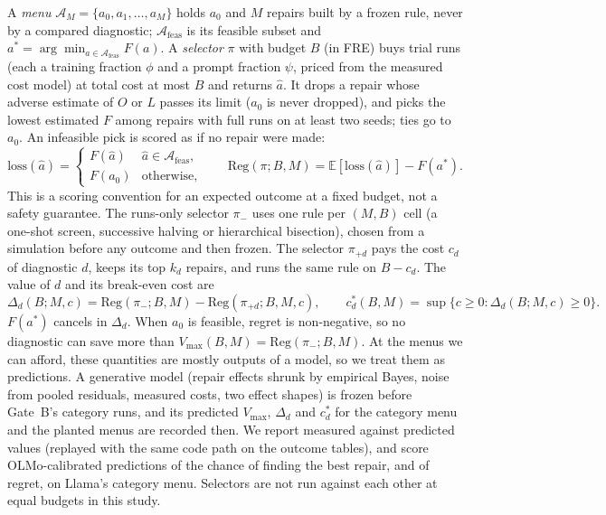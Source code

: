 \documentclass{article}
\theoremstyle{plain}
\theoremstyle{definition}
\theoremstyle{remark}
\begin{document}
A \emph{menu} $\mathcal{A}_M = \{a_0, a_1, \dots, a_M\}$ holds $a_0$ and $M$
repairs built by a frozen rule, never by a compared diagnostic;
$\mathcal{A}_{\mathrm{feas}}$ is its feasible subset and
$a^* = \arg\min_{a \in \mathcal{A}_{\mathrm{feas}}} F(a)$. A \emph{selector}
$\pi$ with budget $B$ (in FRE) buys trial runs (each a training fraction $\phi$
and a prompt fraction $\psi$, priced from the measured cost model) at total
cost at most $B$ and returns $\hat a$. It drops a repair whose adverse estimate
of $O$ or $L$ passes its limit ($a_0$ is never dropped), and picks the lowest
estimated $F$ among repairs with full runs on at least two seeds; ties go to
$a_0$. An infeasible pick is scored as if no repair were made:
\begin{equation*}
  \mathrm{loss}(\hat a) = \begin{cases} F(\hat a) & \hat a \in \mathcal{A}_{\mathrm{feas}},\\ F(a_0) & \text{otherwise,} \end{cases}
  \qquad
  \mathrm{Reg}(\pi; B, M) = \mathbb{E}[\mathrm{loss}(\hat a)] - F(a^*).
\end{equation*}
This is a scoring convention for an expected outcome at a fixed budget, not a
safety guarantee. The runs-only selector $\pi_-$ uses one rule per $(M, B)$
cell (a one-shot screen, successive halving or hierarchical bisection), chosen
from a simulation before any outcome and then frozen. The selector $\pi_{+d}$
pays the cost $c_d$ of diagnostic $d$, keeps its top $k_d$ repairs, and runs
the same rule on $B - c_d$. The value of $d$ and its break-even cost are
\begin{equation*}
  \Delta_d(B; M, c) = \mathrm{Reg}(\pi_-; B, M) - \mathrm{Reg}(\pi_{+d}; B, M, c),
  \qquad
  c^*_d(B, M) = \sup\{c \ge 0 : \Delta_d(B; M, c) \ge 0\}.
\end{equation*}
$F(a^*)$ cancels in $\Delta_d$. When $a_0$ is feasible, regret is
non-negative, so no diagnostic can save more than
$V_{\max}(B, M) = \mathrm{Reg}(\pi_-; B, M)$. At the menus we can afford, these
quantities are mostly outputs of a model, so we treat them as predictions. A
generative model (repair effects shrunk by empirical Bayes, noise from pooled
residuals, measured costs, two effect shapes) is frozen before Gate~B's
category runs, and its predicted $V_{\max}$, $\Delta_d$ and $c^*_d$ for the
category menu and the planted menus are recorded then. We report measured
against predicted values (replayed with the same code path on the outcome
tables), and score OLMo-calibrated predictions of the chance of finding the
best repair, and of regret, on Llama's category menu. Selectors are not run
against each other at equal budgets in this study.
\end{document}
